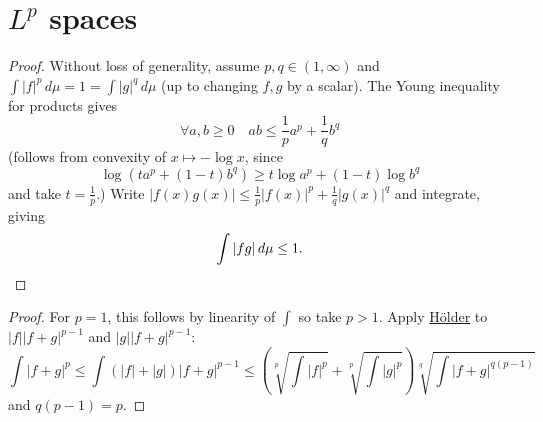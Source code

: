\documentclass{article}
\newcommand{\1}[1]{\mathbbm{1}_{#1}}
\begin{document}
\section{\texorpdfstring{$L^p$}{Lp} spaces}
\begin{proof}
    Without loss of generality, assume $p,q \in (1,\infty)$ and $\int |f|^p \, d\mu = 1 = \int |g|^q \, d\mu$ (up to changing $f,g$ by a scalar).
    The Young inequality for products gives
    \begin{equation*}
        \forall a,b \geq 0 \quad ab \leq \frac{1}{p} a^p + \frac{1}{q} b^q
    \end{equation*}
    (follows from convexity of $x \mapsto -\log x$, since
    \begin{equation*}
        \log(ta^p + (1-t) b^q) \geq t \log a^p + (1-t) \log b^q
    \end{equation*}
    and take $t = \frac{1}{p}$.)
    Write $|f(x) g(x)| \leq \frac{1}{p} |f(x)|^p + \frac{1}{q} |g(x)|^q$ and integrate, giving
    \begin{equation*}
        \int |fg| \, d\mu \leq 1. \qedhere
    \end{equation*}
\end{proof}

\begin{proof}
    For $p=1$, this follows by linearity of $\int$ so take $p > 1$. Apply \hyperlink{prop:holder}{H\"older} to $|f||f+g|^{p-1}$ and $|g||f+g|^{p-1}$:
    \begin{equation*}
        \int |f+g|^p \leq \int (|f|+|g|) |f+g|^{p-1} \leq \left(\sqrt[p]{\int|f|^p}+\sqrt[p]{\int|g|^p}\right) \sqrt[q]{\int|f+g|^{q(p-1)}}
    \end{equation*}
    and $q(p-1) = p$.
\end{proof}
\end{document}
